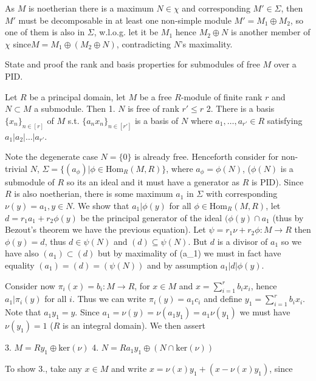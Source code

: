 As \(M\) is noetherian there is a maximum \(N \in \chi\) and corresponding \(M' \in \Sigma\), then \(M'\) must be decomposable
in at least one non-simple module \(M' = M_1 \oplus M_2\), so one of them is also in \(\Sigma\), w.l.o.g. let it be \(M_1\) 
hence \(M_2 \oplus N\) is another member of \(\chi\) since\(M = M_1 \oplus (M_2 \oplus N)\), contradicting \(N\)'s maximality.

State and proof the rank and basis properties for submodules of free \(M\) over a PID. 

Let \(R\) be a principal domain, let \(M\) be a free \(R\)-module of finite rank \(r\) and \(N \subset M\) a submodule. 
Then
1. \(N\) is free of rank \(r' \leq r\)
2. There is a basis \(\{x_n\}_{n \in [r]}\) of \(M\) s.t. \(\{a_nx_n\}_{n \in [r']}\) is a basis of \(N\) where \(a_1, \dots, a_{r'} \in R\)
satisfying \(a_1 | a_2 | \dots | a_{r'}\).


Note the degenerate case \(N = \{0\}\) is already free. Henceforth consider for non-trivial \(N\), \(\Sigma = \{(a_{\phi}) | \phi \in \text{Hom}_R(M, R)\}\), where \(a_{\phi} = \phi(N)\),
(\(\phi(N)\) is a submodule of \(R\) so its an ideal and it must have a generator as \(R\) is PID). Since \(R\) is also noetherian, there is some maximum
\(a_1\) in \(\Sigma\) with corresponding \(\nu(y) = a_1, y \in N\). We show that \(a_1 | \phi(y)\) for all \(\phi \in \text{Hom}_R(M, R)\), let \(d = r_1 a_1 + r_2 \phi(y)\)
be the principal generator of the ideal \((\phi(y) \cap a_1\) (thus by Bezout's theorem we have the previous equation). Let \(\psi = r_1\nu + r_2\phi : M \to R\) then 
\(\phi(y) = d\), thus \(d \in \psi(N)\) and \( (d) \subseteq \psi(N)\). But \(d\) is a divisor of \(a_1\) so we have also \((a_1) \subset (d)\) but by maximality of (a_1)
we must in fact have equality \((a_1) = (d) = (\psi(N))\) and by assumption \(a_1 | d | \phi(y)\).

Consider now \(\pi_i(x) = b_i : M \to R\), for \(x \in M\) and \(x = \sum_{i = 1}^{r} b_i x_i\), hence \(a_1 | \pi_i(y)\) for all \(i\). 
Thus we can write \(\pi_i(y) = a_1 c_i\) and define \(y_1 = \sum_{i = 1}^{r} b_i x_i\). Note that \(a_1y_1 = y\). Since \(a_1 = \nu(y) = \nu(a_1y_1) = a_1 \nu(y_1)\) we must have \(\nu(y_1) = 1\)
(\(R\) is an integral domain). We then assert

3. \(M = Ry_1 \oplus \text{ker}(\nu)\)
4. \(N = Ra_1y_1 \oplus (N \cap \text{ker}(\nu))\)

To show 3., take any \(x \in M\) and write \(x = \nu(x)y_1 + (x - \nu(x)y_1)\), since 


